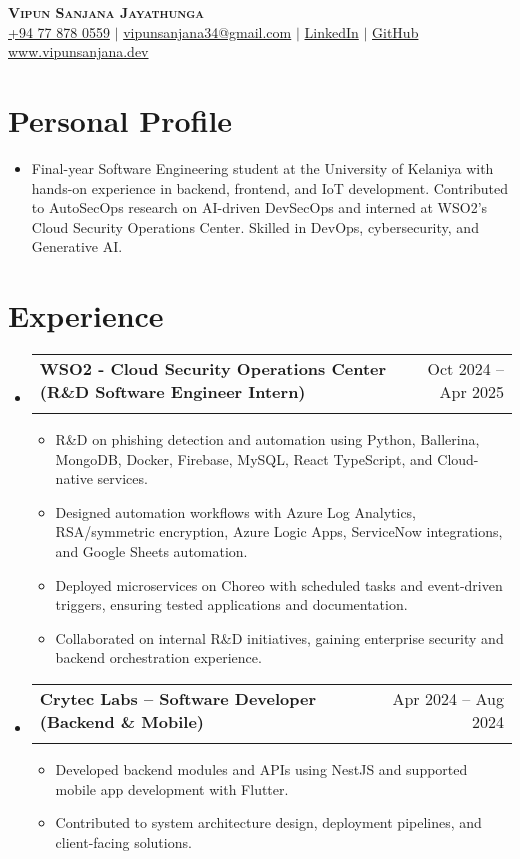 \documentclass[letterpaper,11pt]{article} %
\makeatletter
\newcommand{\resumeItem}[1]{
  \item\small{#1 \vspace{-2pt}}
}
\newcommand{\resumeSubheading}[4]{ %
  \vspace{-2pt}\item
  \begin{tabular*}{0.97\textwidth}[t]{l@{\extracolsep{\fill}}r}
    \textbf{#1} & #2 \\ %
    \textit{\small#3} & \textit{\small #4} \\ %
  \end{tabular*}\vspace{-7pt}
}
\newcommand{\resumeSubHeadingListStart}{\begin{itemize}[leftmargin=0.15in, label={}]}
\newcommand{\resumeSubHeadingListEnd}{\end{itemize}}
\newcommand{\resumeItemListStart}{\begin{itemize}}
\newcommand{\resumeItemListEnd}{\end{itemize}\vspace{-5pt}}
\makeatother
\begin{document}
\begin{center}
    \textbf{\Huge \scshape Vipun Sanjana Jayathunga} \\ \vspace{2pt}
    \small \href{tel:+94778780559}{+94 77 878 0559} $|$ 
    \href{mailto:vipunsanjana34@gmail.com}{vipunsanjana34@gmail.com} $|$ 
    \href{https://linkedin.com/in/vipunsanjana}{LinkedIn} $|$ 
    \href{https://github.com/vipunsanjana}{GitHub} \\ \vspace{2pt}
    \href{https://www.vipunsanjana.dev}{www.vipunsanjana.dev}
\end{center}

\section{Personal Profile}
\resumeSubHeadingListStart
    \resumeItem{
    Final-year Software Engineering student at the University of Kelaniya with hands-on experience in backend, frontend, and IoT development. Contributed to AutoSecOps research on AI-driven DevSecOps and interned at WSO2’s Cloud Security Operations Center. Skilled in DevOps, cybersecurity, and Generative AI.}
\resumeSubHeadingListEnd

\section{Experience}
\resumeSubHeadingListStart
    \resumeSubheading
      {WSO2 - Cloud Security Operations Center (R\&D Software Engineer Intern)}{Oct 2024 -- Apr 2025}{}{}
      \resumeItemListStart
        \resumeItem{R\&D on phishing detection and automation using Python, Ballerina, MongoDB, Docker, Firebase, MySQL, React TypeScript, and Cloud-native services.}
        \resumeItem{Designed automation workflows with Azure Log Analytics, RSA/symmetric encryption, Azure Logic Apps, ServiceNow integrations, and Google Sheets automation.}
        \resumeItem{Deployed microservices on Choreo with scheduled tasks and event-driven triggers, ensuring tested applications and documentation.}
        \resumeItem{Collaborated on internal R\&D initiatives, gaining enterprise security and backend orchestration experience.}
      \resumeItemListEnd

    \resumeSubheading
      {Crytec Labs – Software Developer (Backend \& Mobile)}{Apr 2024 -- Aug 2024}{}{}
      \resumeItemListStart
        \resumeItem{Developed backend modules and APIs using NestJS and supported mobile app development with Flutter.}
        \resumeItem{Contributed to system architecture design, deployment pipelines, and client-facing solutions.}
      \resumeItemListEnd
\resumeSubHeadingListEnd
\end{document}
